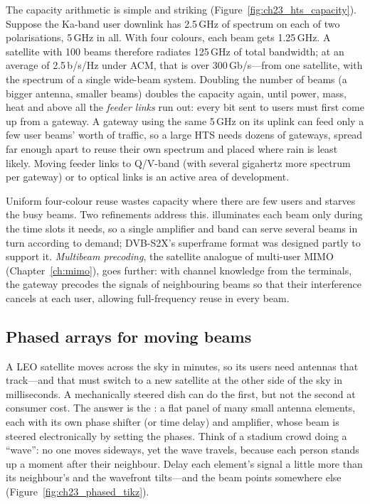 
The capacity arithmetic is simple and striking (Figure~\ref{fig:ch23_hts_capacity}). Suppose the
Ka-band user downlink has 2.5\,GHz of spectrum on each of two polarisations, 5\,GHz in all. With
four colours, each beam gets 1.25\,GHz. A satellite with 100 beams therefore radiates 125\,GHz of
total bandwidth; at an average of 2.5\,b/s/Hz under ACM, that is over 300\,Gb/s---from one
satellite, with the spectrum of a single wide-beam system. Doubling the number of beams (a bigger
antenna, smaller beams) doubles the capacity again, until power, mass, heat and above all the
\emph{feeder links} run out: every bit sent to users must first come up from a gateway. A gateway
using the same 5\,GHz on its uplink can feed only a few user beams' worth of traffic, so a large
HTS needs dozens of gateways, spread far enough apart to reuse their own spectrum and placed where
rain is least likely. Moving feeder links to Q/V-band (with several gigahertz more spectrum per
gateway) or to optical links is an active area of development.

Uniform four-colour reuse wastes capacity where there are few users and starves the busy
beams. Two refinements address this.  illuminates each beam only during the
time slots it needs, so a single amplifier and band can serve several beams in turn according
to demand; DVB-S2X's superframe format was designed partly to support it. \emph{Multibeam
precoding}, the satellite analogue of multi-user MIMO (Chapter~\ref{ch:mimo}), goes further:
with channel knowledge from the terminals, the gateway precodes the signals of neighbouring beams
so that their interference cancels at each user, allowing full-frequency reuse in every beam.

\subsection{Phased arrays for moving beams}

A LEO satellite moves across the sky in minutes, so its users need antennas that track---and
that must switch to a new satellite at the other side of the sky in milliseconds. A
mechanically steered dish can do the first, but not the second at consumer cost. The answer is
the : a flat panel of many small antenna elements, each with its own phase
shifter (or time delay) and amplifier, whose beam is steered electronically by setting the
phases. Think of a stadium crowd doing a ``wave'': no one moves sideways, yet the wave travels,
because each person stands up a moment after their neighbour. Delay each element's signal a
little more than its neighbour's and the wavefront tilts---and the beam points somewhere else
(Figure~\ref{fig:ch23_phased_tikz}).

